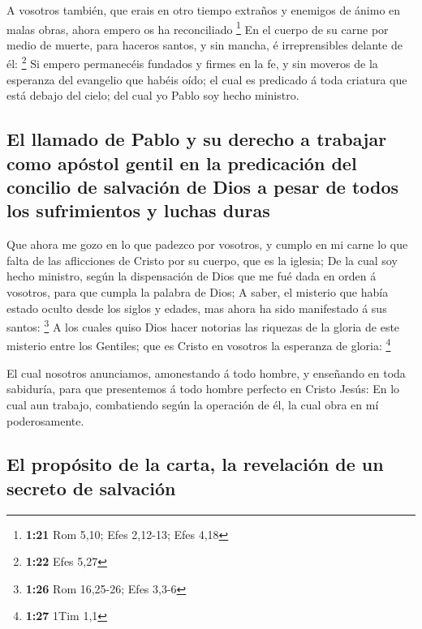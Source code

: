  A vosotros también, que erais en otro tiempo extraños y
enemigos de ánimo en malas obras, ahora empero os ha reconciliado
\footnote{\textbf{1:21} Rom 5,10; Efes 2,12-13; Efes 4,18} 
En el cuerpo de su carne por medio de muerte, para haceros santos, y sin
mancha, é irreprensibles delante de él: \footnote{\textbf{1:22} Efes
  5,27}  Si empero permanecéis fundados y firmes en la fe,
y sin moveros de la esperanza del evangelio que habéis oído; el cual es
predicado á toda criatura que está debajo del cielo; del cual yo Pablo
soy hecho ministro.

\hypertarget{el-llamado-de-pablo-y-su-derecho-a-trabajar-como-apuxf3stol-gentil-en-la-predicaciuxf3n-del-concilio-de-salvaciuxf3n-de-dios-a-pesar-de-todos-los-sufrimientos-y-luchas-duras}{%
\subsection{El llamado de Pablo y su derecho a trabajar como apóstol
gentil en la predicación del concilio de salvación de Dios a pesar de
todos los sufrimientos y luchas
duras}\label{el-llamado-de-pablo-y-su-derecho-a-trabajar-como-apuxf3stol-gentil-en-la-predicaciuxf3n-del-concilio-de-salvaciuxf3n-de-dios-a-pesar-de-todos-los-sufrimientos-y-luchas-duras}}

 Que ahora me gozo en lo que padezco por vosotros, y cumplo
en mi carne lo que falta de las aflicciones de Cristo por su cuerpo, que
es la iglesia;  De la cual soy hecho ministro, según la
dispensación de Dios que me fué dada en orden á vosotros, para que
cumpla la palabra de Dios;  A saber, el misterio que había
estado oculto desde los siglos y edades, mas ahora ha sido manifestado á
sus santos: \footnote{\textbf{1:26} Rom 16,25-26; Efes 3,3-6}
 A los cuales quiso Dios hacer notorias las riquezas de la
gloria de este misterio entre los Gentiles; que es Cristo en vosotros la
esperanza de gloria: \footnote{\textbf{1:27} 1Tim 1,1}

 El cual nosotros anunciamos, amonestando á todo hombre, y
enseñando en toda sabiduría, para que presentemos á todo hombre perfecto
en Cristo Jesús:  En lo cual aun trabajo, combatiendo según
la operación de él, la cual obra en mí poderosamente.

\hypertarget{el-propuxf3sito-de-la-carta-la-revelaciuxf3n-de-un-secreto-de-salvaciuxf3n}{%
\subsection{El propósito de la carta, la revelación de un secreto de
salvación}\label{el-propuxf3sito-de-la-carta-la-revelaciuxf3n-de-un-secreto-de-salvaciuxf3n}}

